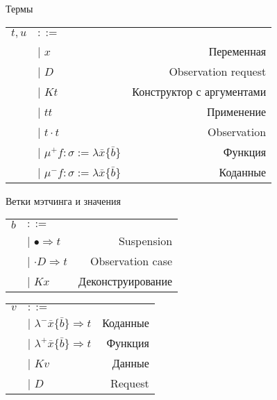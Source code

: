 \documentclass[10pt, mathserif]{beamer}
\let\\\tabularnewline
\let\\\tabularnewline
\newcommand{\graybox}[1]{\colorbox{light-gray}{#1}}
\theoremstyle{definition}
\begin{document}
\begin{frame}[c]{Термы}
\begin{tabular}{ l l r }
  $t,u $&$::=$ & \\
  &|  $x$ & Переменная \\
  &|  $D$ & Observation request  \\
  &|  $K t$ & \graybox{Конструктор с аргументами} \\
  &|  $t t$ & Применение  \\
  &|  $t \cdot t$  & \graybox{Observation}  \\
  &|  $\mu^+ f: \sigma := \lambda \bar{x}\{\bar{b}\}$ & \graybox{Функция } \\
  &|  $\mu^- f: \sigma := \lambda \bar{x}\{\bar{b}\}$ & \graybox{Коданные} \\
\end{tabular}


\end{frame}

\begin{frame}[c]{Ветки мэтчинга и значения}
\begin{tabular}{ l l r }
  $b $ & $::=$ & \\
  &|  $\bullet \Rightarrow t$ & Suspension \\
  &|  $\cdot D \Rightarrow t$  & Observation case \\
  &|  $K x$ & Деконструирование \\
\end{tabular}

\vspace{1cm}

\begin{tabular}{ l l r }
  $v $ & $::=$ & \\
  &|  $\lambda^{-} \bar{x}\{\bar{b}\} \Rightarrow t$ & Коданные\\
  &|  $\lambda^{+} \bar{x}\{\bar{b}\} \Rightarrow t$ & Функция \\
  &|  $K v$ & Данные\\
  &|  $D$   & Request\\
\end{tabular}
\end{frame}
\end{document}
